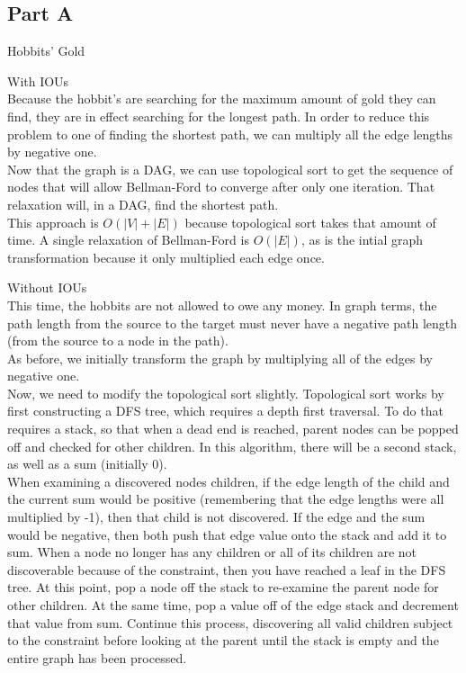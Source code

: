 \documentclass[12pt,twoside]{article}
\begin{document}
\begin{problems}

\section*{Part A}
\problem Hobbits' Gold
\begin{problemparts}
\problempart With IOUs\\
Because the hobbit's are searching for the maximum amount of gold they can find, they are in effect searching for the longest path.  In order to reduce this problem to one of finding the shortest path, we can multiply all the edge lengths by negative one.\\

Now that the graph is a DAG, we can use topological sort to get the sequence of nodes that will allow Bellman-Ford to converge after only one iteration.  That relaxation will, in a DAG, find the shortest path.  \\

This approach is $O(|V|+|E|)$ because topological sort takes that amount of time.  A single relaxation of Bellman-Ford is $O(|E|)$, as is the intial graph transformation because it only multiplied each edge once.

\problempart Without IOUs\\
This time, the hobbits are not allowed to owe any money.  In graph terms, the path length from the source to the target must never have a negative path length (from the source to a node in the path).  \\

As before, we initially transform the graph by multiplying all of the edges by negative one.\\

Now, we need to modify the topological sort slightly.  Topological sort works by first constructing a DFS tree, which requires a depth first traversal.  To do that requires a stack, so that when a dead end is reached, parent nodes can be popped off and checked for other children.  In this algorithm, there will be a second stack, as well as a sum (initially 0).  \\

When examining a discovered nodes children, if the edge length of the child and the current sum would be positive (remembering that the edge lengths were all multiplied by -1), then that child is not discovered.  If the edge and the sum would be negative, then both push that edge value onto the stack and add it to sum.  When a node no longer has any children or all of its children are not discoverable because of the constraint, then you have reached a leaf in the DFS tree.  At this point, pop a node off the stack to re-examine the parent node for other children.  At the same time, pop a value off of the edge stack and decrement that value from sum.  Continue this process, discovering all valid children subject to the constraint before looking at the parent until the stack is empty and the entire graph has been processed.\\


\end{problemparts}
\end{problems}
\end{document}
